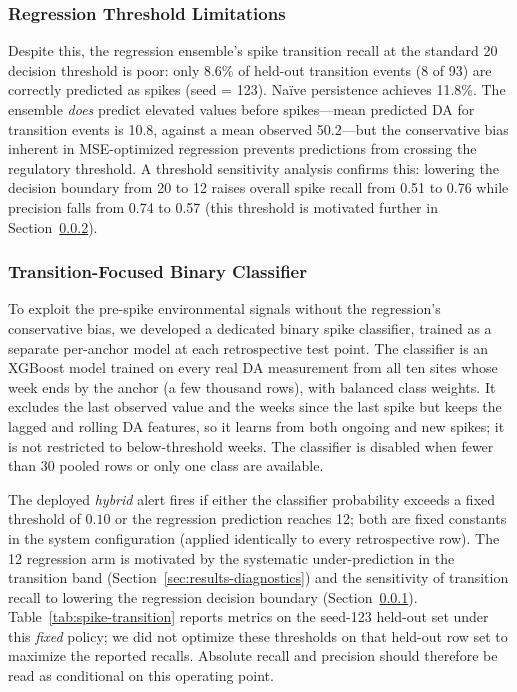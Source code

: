 \documentclass[toxins,article,submit,moreauthors]{Definitions/mdpi}
\begin{document}
\subsubsection{Regression Threshold Limitations}
\label{sec:results-threshold-limit}

Despite this, the regression ensemble's spike transition recall at the standard \SI{20}{\microgrampeg} decision threshold is poor: only 8.6\% of held-out transition events (8 of 93) are correctly predicted as spikes (seed = 123). Na\"ive persistence achieves 11.8\%. The ensemble \emph{does} predict elevated values before spikes---mean predicted DA for transition events is \SI{10.8}{\microgrampeg}, against a mean observed \SI{50.2}{\microgrampeg}---but the conservative bias inherent in MSE-optimized regression prevents predictions from crossing the regulatory threshold. A threshold sensitivity analysis confirms this: lowering the decision boundary from 20 to \SI{12}{\microgrampeg} raises overall spike recall from 0.51 to 0.76 while precision falls from 0.74 to 0.57 (this threshold is motivated further in Section~\ref{sec:results-spike-classifier}).

\subsubsection{Transition-Focused Binary Classifier}
\label{sec:results-spike-classifier}

To exploit the pre-spike environmental signals without the regression's conservative bias, we developed a dedicated binary spike classifier, trained as a separate per-anchor model at each retrospective test point. The classifier is an XGBoost model trained on every real DA measurement from all ten sites whose week ends by the anchor (a few thousand rows), with balanced class weights. It excludes the last observed value and the weeks since the last spike but keeps the lagged and rolling DA features, so it learns from both ongoing and new spikes; it is not restricted to below-threshold weeks. The classifier is disabled when fewer than 30 pooled rows or only one class are available.

The deployed \emph{hybrid} alert fires if either the classifier probability exceeds a fixed threshold of $0.10$ or the regression prediction reaches \SI{12}{\microgrampeg}; both are fixed constants in the system configuration (applied identically to every retrospective row). The \SI{12}{\microgrampeg} regression arm is motivated by the systematic under-prediction in the transition band (Section~\ref{sec:results-diagnostics}) and the sensitivity of transition recall to lowering the regression decision boundary (Section~\ref{sec:results-threshold-limit}). Table~\ref{tab:spike-transition} reports metrics on the seed-123 held-out set under this \emph{fixed} policy; we did not optimize these thresholds on that held-out row set to maximize the reported recalls. Absolute recall and precision should therefore be read as conditional on this operating point.
\end{document}
